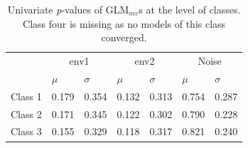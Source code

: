 		\begin{table}[h!]
			
			\small
			\caption{Univariate \textit{p}-values of GLM$_{mv}$s at the level of classes. Class four is missing as no models of this class converged.}
			\centering
			
			\begin{tabular}{@{}lllllll@{}}
				
				\toprule
				& \multicolumn{2}{c}{env1} & \multicolumn{2}{c}{env2} & \multicolumn{2}{c}{Noise}\\ \cmidrule(l){2-3} \cmidrule(l){4-5} \cmidrule(l){6-7}
				& $\mu$ & $\sigma$ & $\mu$ & $\sigma$ & $\mu$ & $\sigma$\\
				\hline
				Class 1 & 0.179 & 0.354 & 0.132 & 0.313 & 0.754 & 0.287 \\
				Class 2 & 0.171 & 0.345 & 0.122 & 0.302 & 0.790 & 0.228 \\
				Class 3 & 0.155 & 0.329 & 0.118 & 0.317 & 0.821 & 0.240	 \\
				\toprule
				
			\end{tabular}
			
			\label{tab:GLMUNI1}
			
		\end{table}
		

